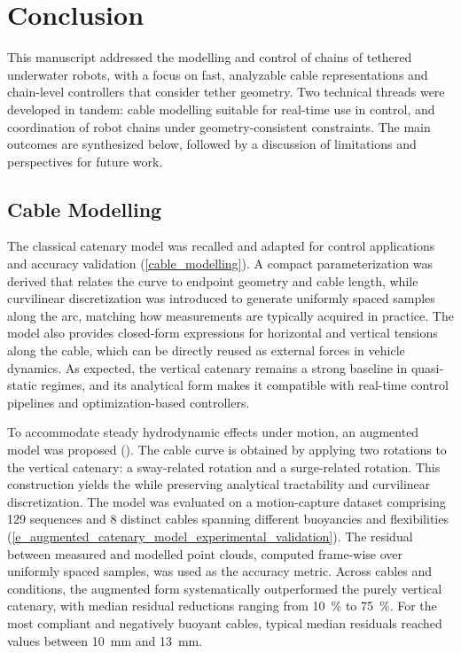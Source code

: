 \chapter{Conclusion}
\label{conclusion}

\minitoc{}

This manuscript addressed the modelling and control of chains of tethered underwater robots, with a
focus on fast, analyzable cable representations and chain-level controllers that consider tether
geometry. Two technical threads were developed in tandem: cable modelling suitable for real-time
use in control, and coordination of robot chains under geometry-consistent constraints. The main
outcomes are synthesized below, followed by a discussion of limitations and perspectives for future
work.

\section{Cable Modelling}
\label{c_cable_modelling}

The classical catenary model was recalled and adapted for control applications and accuracy
validation (\cref{cable_modelling}). A compact parameterization was derived that relates the curve
to endpoint geometry and cable length, while curvilinear discretization was introduced to generate
uniformly spaced samples along the arc, matching how measurements are typically acquired in
practice. The model also provides closed-form expressions for horizontal and vertical tensions
along the cable, which can be directly reused as external forces in vehicle dynamics. As expected,
the vertical catenary remains a strong baseline in quasi-static regimes, and its analytical form
makes it compatible with real-time control pipelines and optimization-based controllers.

To accommodate steady hydrodynamic effects under motion, an augmented model was proposed
(). The cable curve is obtained by applying two rotations to the
vertical catenary: a sway-related rotation and a surge-related rotation. This construction yields
the \thetagammamodel{} while preserving analytical tractability and curvilinear discretization. The
model was evaluated on a motion-capture dataset comprising \num{129} sequences and \num{8} distinct
cables spanning different buoyancies and flexibilities
(\cref{e_augmented_catenary_model_experimental_validation}). The residual between measured and
modelled point clouds, computed frame-wise over uniformly spaced samples, was used as the accuracy
metric. Across cables and conditions, the augmented form systematically outperformed the purely
vertical catenary, with median residual reductions ranging from \qty{10}{\percent} to
\qty{75}{\percent}. For the most compliant and negatively buoyant cables, typical median residuals
reached values between \qty{10}{\milli\meter} and \qty{13}{\milli\meter}.

